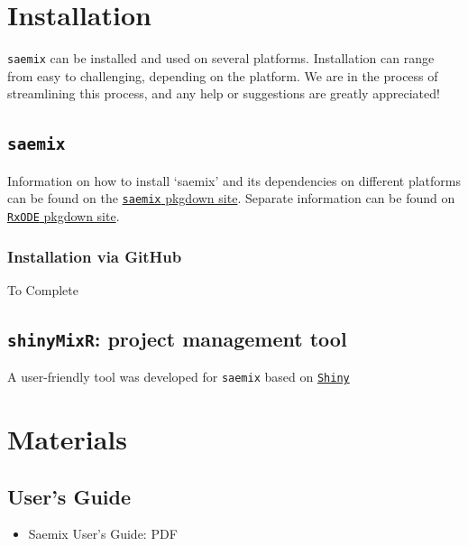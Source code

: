 \documentclass[]{book}
\providecommand{\tightlist}{%
  \setlength{\itemsep}{0pt}\setlength{\parskip}{0pt}}
\begin{document}
\chapter{Installation}\label{install}

\texttt{saemix} can be installed and used on several platforms.
Installation can range from easy to challenging, depending on the
platform. We are in the process of streamlining this process, and any
help or suggestions are greatly appreciated!

\section{\texorpdfstring{\texttt{saemix}}{saemix}}\label{saemix}

Information on how to install `saemix' and its dependencies on different
platforms can be found on the
\href{https://saemixdevelopment.github.io/saemix/index.html}{\texttt{saemix}
pkgdown site}. Separate information can be found on
\href{https://saemixdevelopment.github.io/RxODE/index.html}{\texttt{RxODE}
pkgdown site}.

\subsection{Installation via GitHub}\label{installation-via-github}

To Complete

\section{\texorpdfstring{\texttt{shinyMixR}: project management
tool}{shinyMixR: project management tool}}\label{shinymixr-project-management-tool}

A user-friendly tool was developed for \texttt{saemix} based on
\href{http://shiny.rstudio.com/}{\texttt{Shiny}}

\chapter{Materials}\label{materials}

\section{User's Guide}\label{users-guide}

\begin{itemize}
\tightlist
\item
  Saemix User's Guide: PDF
\end{itemize}
\end{document}

